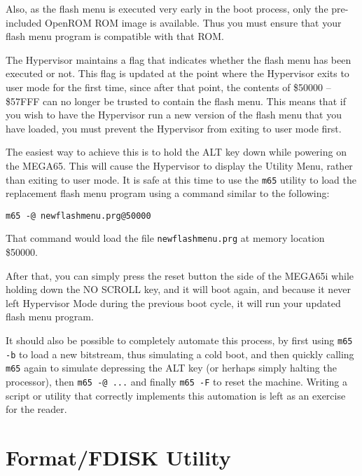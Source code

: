 Also, as the flash menu is executed very early in the boot process, only the pre-included OpenROM ROM image is available.  Thus you must ensure that your flash menu program is compatible with that ROM.

The Hypervisor maintains a flag that indicates whether the flash menu has been executed or not. This flag is updated at the point
where the Hypervisor exits to user mode for the first time, since after that point, the contents of \$50000 -- \$57FFF can no longer
be trusted to contain the flash menu.  This means that if you wish to have the Hypervisor run a new version of the flash menu that
you have loaded, you must prevent the Hypervisor from exiting to user mode first.

The easiest way to achieve this is to hold the ALT key down while powering on the MEGA65.  This will cause the Hypervisor to display the Utility Menu, rather than exiting to user mode.  It is safe at this time to use the {\tt m65} utility to load the replacement flash menu program using a command similar to the following:

\begin{tcolorbox}[colback=black,coltext=white]
\verbatimfont{\codefont}
\begin{verbatim}
m65 -@ newflashmenu.prg@50000
\end{verbatim}
\end{tcolorbox}

That command would load the file {\tt newflashmenu.prg} at memory location \$50000.

After that, you can simply press the reset button the side of the MEGA65i while holding down the NO SCROLL key, and it will boot again, and because it never left Hypervisor Mode during the previous boot cycle, it will run your updated flash menu program.

It should also be possible to completely automate this process, by first using {\tt m65 -b} to load a new bitstream, thus simulating a cold boot, and then quickly calling {\tt m65} again to simulate depressing the ALT key (or herhaps simply halting the processor), then {\tt m65 -@ ...} and finally {\tt m65 -F} to reset the machine.  Writing a script or utility that correctly implements this automation is left as an exercise for the reader.

\section{Format/FDISK Utility}

